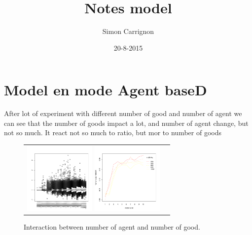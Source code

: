 \documentclass[a4paper]{article}
\title{Notes model}
\author{Simon Carrignon}
\date{20-8-2015}
\begin{document}
\section{Model en mode Agent baseD}
After lot of experiment with different number of good and number of agent we can see that the number of goods impact a lot, and number of agent change, but not so much. It react not so much to ratio, but mor to number of goods

\begin{figure}[htp]
    \centering
    \begin{tabular}{cc}
	\includegraphics[width=3.5cm]{interactionNGoodNAgent.pdf}
	\includegraphics[width=3.5cm]{interactionNGoodNAgentSD.pdf}
    \end{tabular}
    \caption{Interaction between number of agent and number of good.}
\end{figure}
\end{document}
